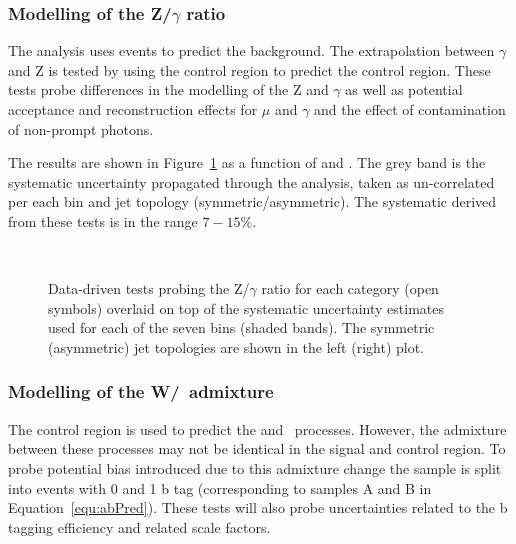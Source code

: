 \subsubsection{Modelling of the Z/$\gamma$ ratio}

The \alphat analysis uses \gj events to predict the \znunu background. The extrapolation 
between $\gamma$ and Z is tested by using the \gj control region to predict the \mmj control region.
These tests probe differences in the modelling of the Z and $\gamma$ as well as potential acceptance and
reconstruction effects for $\mu$ and $\gamma$ and the effect of contamination of non-prompt photons.

The results are shown in Figure~\ref{fig:closurePhoToMuMu} as a function of \scalht and \njet. 
The grey band is the systematic uncertainty propagated through the analysis, 
taken as un-correlated per each \scalht bin and jet topology (symmetric/asymmetric). The systematic derived from these tests is
in the range $7-15\%$.


\begin{figure}[h!]
  \begin{center}
    ~~
    \caption{Data-driven tests probing the Z/$\gamma$ ratio for each
      \njet category (open symbols) overlaid on top of the systematic
      uncertainty estimates used for each of the seven \scalht bins
      (shaded bands). 
      The symmetric (asymmetric) jet topologies are shown in the left (right) plot.      
    }
    \label{fig:closurePhoToMuMu}
  \end{center} 
\end{figure}

\subsubsection{Modelling of the W/\ttbar~admixture}

The \mj control region is used to predict the \wj and \ttbar~processes. However, the admixture
between these processes may not be identical in the signal and control region.
To probe potential bias introduced due to this admixture change the sample is split into events with
0 and 1 b tag (corresponding to samples A and B in Equation~\ref{equ:abPred}). These tests will also probe 
uncertainties related to the b tagging efficiency and related scale factors. 

